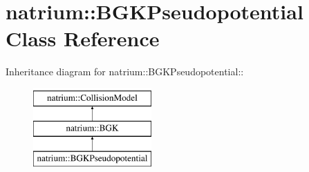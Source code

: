 \hypertarget{classnatrium_1_1BGKPseudopotential}{
\section{natrium::BGKPseudopotential Class Reference}
\label{classnatrium_1_1BGKPseudopotential}
}
Inheritance diagram for natrium::BGKPseudopotential::\begin{figure}[H]
\begin{center}
\leavevmode
\includegraphics[height=3cm]{classnatrium_1_1BGKPseudopotential}
\end{center}
\end{figure}
